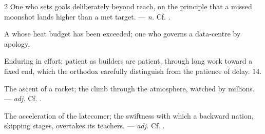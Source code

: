 \begin{multicols}{2}
 One who sets goals deliberately beyond reach, on the principle that a missed moonshot lands higher than a met target. —  \textit{n.} Cf. .

  A  whose heat budget has been exceeded; one who governs a data-centre by apology.

 Enduring in effort; patient as builders are patient, through long work toward a fixed end, which the orthodox carefully distinguish from the patience of delay.   14.

 The ascent of a rocket; the climb through the atmosphere, watched by millions.  —  \textit{adj.} Cf. .

 The acceleration of the latecomer; the swiftness with which a backward nation, skipping stages, overtakes its teachers. —  \textit{adj.} Cf. .

\end{multicols}

